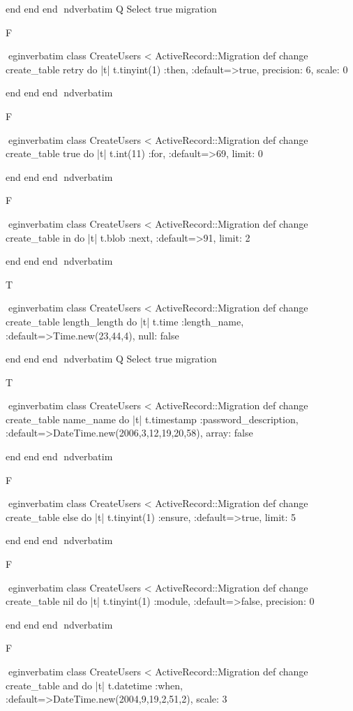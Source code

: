     end 
  end 
end
nd{verbatim}
Q
 Select true migration

F

egin{verbatim}
 class CreateUsers < ActiveRecord::Migration 
  def change 
    create_table retry do |t| 
      t.tinyint(1) :then, :default=>true, precision: 6, scale: 0
    
    end 
  end 
end
nd{verbatim}

F

egin{verbatim}
 class CreateUsers < ActiveRecord::Migration 
  def change 
    create_table true do |t| 
      t.int(11) :for, :default=>69, limit: 0
    
    end 
  end 
end
nd{verbatim}

F

egin{verbatim}
 class CreateUsers < ActiveRecord::Migration 
  def change 
    create_table in do |t| 
      t.blob :next, :default=>91, limit: 2
    
    end 
  end 
end
nd{verbatim}

T

egin{verbatim}
 class CreateUsers < ActiveRecord::Migration 
  def change 
    create_table length_length do |t| 
      t.time :length_name, :default=>Time.new(23,44,4), null: false
    
    end 
  end 
end
nd{verbatim}
Q
 Select true migration

T

egin{verbatim}
 class CreateUsers < ActiveRecord::Migration 
  def change 
    create_table name_name do |t| 
      t.timestamp :password_description, :default=>DateTime.new(2006,3,12,19,20,58), array: false
    
    end 
  end 
end
nd{verbatim}

F

egin{verbatim}
 class CreateUsers < ActiveRecord::Migration 
  def change 
    create_table else do |t| 
      t.tinyint(1) :ensure, :default=>true, limit: 5
    
    end 
  end 
end
nd{verbatim}

F

egin{verbatim}
 class CreateUsers < ActiveRecord::Migration 
  def change 
    create_table nil do |t| 
      t.tinyint(1) :module, :default=>false, precision: 0
    
    end 
  end 
end
nd{verbatim}

F

egin{verbatim}
 class CreateUsers < ActiveRecord::Migration 
  def change 
    create_table and do |t| 
      t.datetime :when, :default=>DateTime.new(2004,9,19,2,51,2), scale: 3
    

